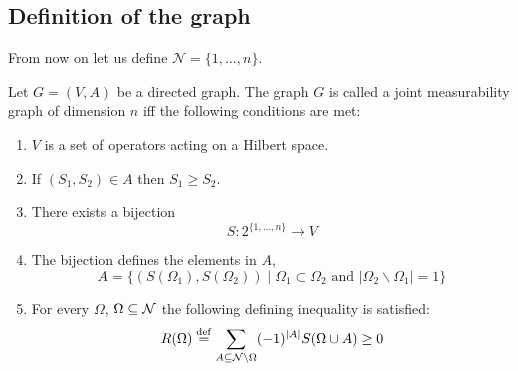 \documentclass[10pt, a4paper]{amsart}
\begin{document}
\newpage

\subsection{Definition of the graph}
 From now on let us define  $\mathcal{N} = \{1, \ldots , n\}$. 

%

\begin{definition}\label{definition_JMG}
Let $G = (V,A)$ be a directed graph. The graph $G$ is called a joint measurability graph of dimension $n$ iff the following conditions are met:
\begin{enumerate}
\item $V$ is a set of operators acting on a Hilbert space. 
\item If $(S_{1},S_{2})\in A$ then $S_{1}\geq S_{2}$.
\item  There exists a bijection 
$$
S:2^{\{1,\ldots , n\}}\to V
$$
\item The bijection defines the elements in $A$, 
$$
A = \{
(S(\Omega_{1}), S(\Omega_{2}))\mid
\Omega_{1} \subset \Omega_{2} \mbox{ and } |\Omega_{2}\backslash \Omega_{1}| = 1
\}
$$
\item For every $\Omega$,  $\Omega \subseteq \mathcal{N} $ the following defining inequality is satisfied:
\begin{equation}\label{eq:graph_definition_inequality}
R(\Omega)\overset{\mathrm{def}}{=}\sum_{A\subseteq \mathcal{N}\backslash \Omega}  (-1)^{|A|}S(\Omega \cup A)\geq 0
\end{equation}


\end{enumerate}

\end{definition}
\end{document}
